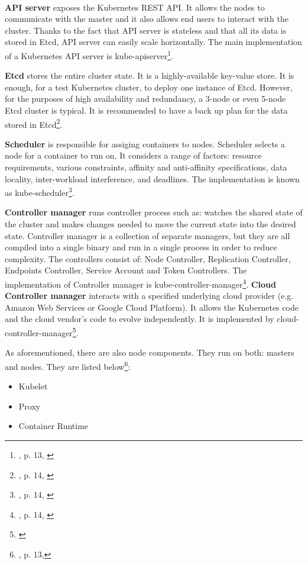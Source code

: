 \paragraph{}
\textbf{API server} exposes the Kubernetes REST API. It allows the nodes to communicate with the master and it also allows end users to interact with the cluster. Thanks to the fact that API server is stateless and that all its data is stored in Etcd, API server can easily scale horizontally. The main implementation of a Kubernetes API server is kube-apiserver\footnote{\cite{book-mastering-k8s}, p. 13, \cite{k8s-cluster,k8s-components}}.

\textbf{Etcd} stores the entire cluster state. It is a highly-available key-value store. It is enough, for a test Kubernetes cluster, to deploy one instance of Etcd. However, for the purposes of high availability and redundancy, a 3-node or even 5-node Etcd cluster is typical. It is recommended to have a back up plan for the data stored in Etcd\footnote{\cite{book-mastering-k8s}, p. 14, \cite{k8s-components}}.

\textbf{Scheduler} is responsible for assiging containers to nodes. Scheduler selects a node for a container to run on. It considers a range of factors: resource requirements, various constraints, affinity and anti-affinity specifications, data locality, inter-workload interference, and deadlines. The implementation is known as kube-scheduler\footnote{\cite{book-mastering-k8s}, p. 14, \cite{k8s-components}}.

\textbf{Controller manager} runs controller process such as: watches the shared state of the cluster and makes changes needed to move the current state into the desired state. Controller manager is a collection of separate managers, but they are all compiled into a single binary and run in a single process in order to reduce complexity. The controllers consist of: Node Controller, Replication Controller, Endpoints Controller, Service Account and Token Controllers. The implementation of Controller manager is kube-controller-manager\footnote{\cite{book-mastering-k8s}, p. 14, \cite{k8s-components}}. \textbf{Cloud Controller manager} interacts with a specified underlying cloud provider (e.g. Amazon Web Services or Google Cloud Platform). It allows the Kubernetes code and the cloud vendor’s code to evolve independently. It is implemented by cloud-controller-manager\footnote{\cite{k8s-components}}.

As aforementioned, there are also node components. They run on both: masters and nodes. They are listed below\footnote{\cite{book-mastering-k8s}, p. 13,\cite{k8s-components}}:
\begin{itemize}
\item Kubelet
\item Proxy
\item Container Runtime
\end{itemize}

